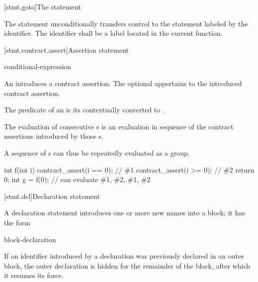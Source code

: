 [stmt.goto]{The  statement}%

\pnum
The  statement unconditionally transfers control to the
statement labeled by the identifier. The identifier shall be a
%
label located in the current function.

[stmt.contract.assert]{Assertion statement}

\begin{bnf}
\br
      \terminal{(} conditional-expression \terminal{)} \terminal{;}
\end{bnf}

\pnum
{}
An 
introduces a contract assertion.
The optional 
appertains to the introduced contract assertion.

\pnum
The predicate
of an 
is its 
contextually converted to .

\pnum
The evaluation of consecutive s
is an evaluation in sequence of
the contract assertions introduced
by those s.
\begin{note}
A sequence of s
can thus be repeatedly evaluated as a group.
\begin{example}
\begin{codeblock}
int f(int i)
{
  contract_assert(i == 0);  // \#1
  contract_assert(i >= 0);  // \#2
  return 0;
}
int g = f(0);   // can evaluate \#1, \#2, \#1, \#2
\end{codeblock}
\end{example}
\end{note}

[stmt.dcl]{Declaration statement}%

\pnum
A declaration statement introduces one or more new names into a
block; it has the form
\begin{bnf}
\br
    block-declaration
\end{bnf}
\begin{note}
If an identifier introduced by a declaration was previously declared in
an outer block,
%
%
%
the outer declaration is hidden
for the remainder of the block,
after which it resumes its force.
\end{note}

